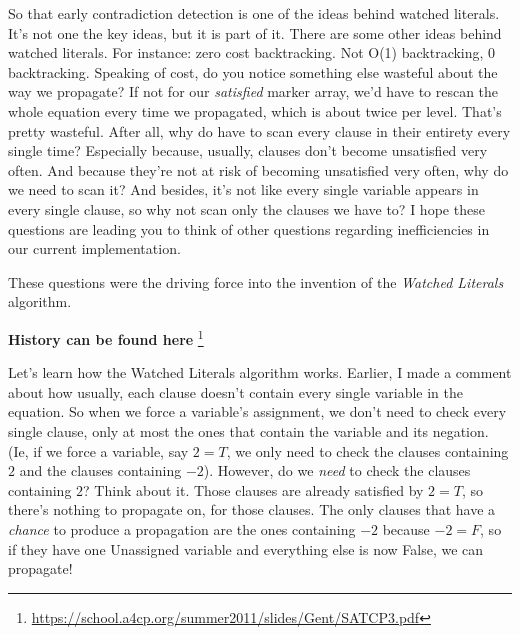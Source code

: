 So that early contradiction detection is one of the ideas behind watched literals. 
It's not one the key ideas, but it is part of it. There are some other ideas behind 
watched literals. For instance: zero cost backtracking. Not O(1) backtracking, $0$
backtracking. Speaking of cost, do you notice something else wasteful about the 
way we propagate? If not for our \textit{satisfied} marker array, we'd have to 
rescan the whole equation every time we propagated, which is about twice per level. 
That's pretty wasteful. After all, why do have to scan every clause in their entirety
every single time? Especially because, usually, clauses don't become unsatisfied very 
often. And because they're not at risk of becoming unsatisfied very often, why do we need 
to scan it? And besides, it's not like every single variable appears in every single 
clause, so why not scan only the clauses we have to? I hope these questions are leading 
you to think of other questions regarding inefficiencies in our current implementation.

These questions were the driving force into the invention of the 
\textit{Watched Literals} algorithm.

\textbf{History can be found here}
\footnote{\url{https://school.a4cp.org/summer2011/slides/Gent/SATCP3.pdf}}

Let's learn how the Watched Literals algorithm works. Earlier, I made a comment 
about how usually, each clause doesn't contain every single variable in the 
equation. So when we force a variable's assignment, we don't need to check 
every single clause, only at most the ones that contain the variable and its 
negation. (Ie, if we force a variable, say $2 = T$, we only need to check the clauses 
containing $2$ and the clauses containing $-2$). However, do we \textit{need} to 
check the clauses containing $2$? Think about it. Those clauses are already 
satisfied by $2 = T$, so there's nothing to propagate on, for those clauses. 
The only clauses that have a \textit{chance} to produce a propagation are the 
ones containing $-2$ because $-2 = F$, so if they have one Unassigned variable 
and everything else is now False, we can propagate!

